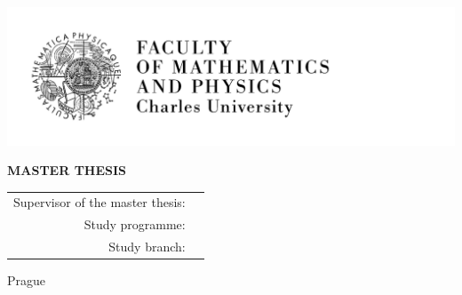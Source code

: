 
\pagestyle{empty}
\hypersetup{pageanchor=false}
\begin{center}

\centerline{\mbox{\includegraphics[width=166mm]{img/logo.pdf}}}

\vspace{-8mm}
\vfill

{\bf\Large MASTER THESIS}

\vfill

{\LARGE\ThesisAuthor}

\vspace{15mm}

{\LARGE\bfseries\ThesisTitle}

\vfill

\Department

\vfill

\begin{tabular}{rl}
	
	Supervisor of the master thesis: & \Supervisor \\
	\noalign{\vspace{2mm}}
	Study programme: & \StudyProgramme \\
	\noalign{\vspace{2mm}}
	Study branch: & \StudyBranch \\
\end{tabular}

\vfill

Prague \YearSubmitted

\end{center}
